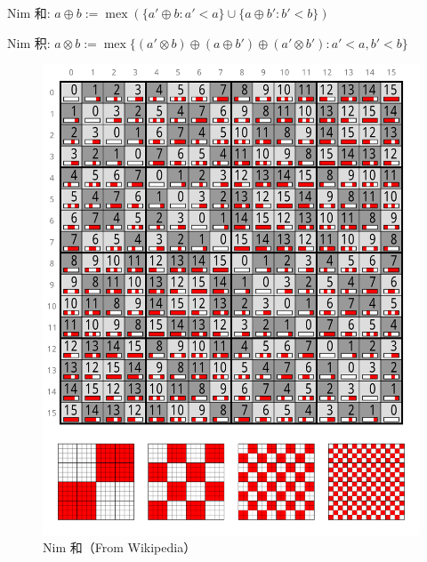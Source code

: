 Nim 和: \(a\oplus b:=\operatorname{mex}\left(\{a'\oplus b:a'<a\}\cup\{a\oplus b':b'<b\}\right)\)

Nim 积: \(a\otimes b:=\operatorname{mex}\{(a'\otimes b)\oplus(a\oplus b')\oplus(a'\otimes b'):a'<a,b'<b\}\)

\begin{figure}
    \label{img:nim-add}
    \includegraphics{img/Nimber-addition.svg}
    \caption{Nim 和（From Wikipedia）}
\end{figure}


